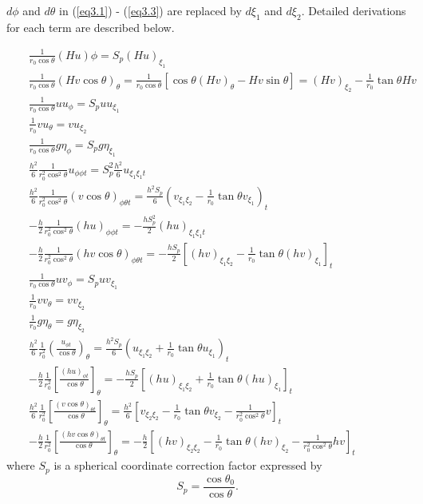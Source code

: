 \documentclass[11pt]{article}
\newcommand{\be}{\begin{equation}}
\newcommand{\ee}{\end{equation}}
\newcommand{\ba}{\begin{eqnarray}}
\newcommand{\ea}{\end{eqnarray}}
\begin{document}
$d\phi$ and $d\theta$ in (\ref{eq3.1}) - (\ref{eq3.3}) are replaced by $d\xi_1$ and $d\xi_2$. Detailed derivations for each term are described below.

\ba
&& \frac{1}{r_0 \cos \theta} (Hu)\phi = S_p (Hu)_{\xi_1}
\\
&&
\frac{1}{r_0 \cos \theta} (Hv\cos \theta)_\theta = \frac{1}{r_0 \cos \theta}  \left [ \cos \theta (Hv)_\theta - Hv \sin \theta \right ]
= (Hv)_{\xi_2} - \frac{1}{r_0} \tan \theta Hv
\\
&&
\frac{1}{r_0 \cos \theta} u u_\phi =S_p  u u_{\xi_1}
\\
&&
\frac{1}{r_0} v u_\theta = v u_{\xi_2}
\\
&&
\frac{1}{r_0 \cos \theta} g  \eta_\phi = S_p  g \eta_{\xi_1}
\\
&&
\frac{h^2}{6} \frac{1}{r_0^2 \cos ^2 \theta} u_{\phi \phi t} = S_p^2 \frac{h^2}{6} u_{\xi_1 \xi_1 t}
\\
&&
\frac{h^2}{6} \frac{1}{r_0^2 \cos ^2 \theta} (v \cos \theta)_{\phi \theta t} = \frac{h^2 S_p}{6} \left ( v_{\xi_1 \xi_2} -  \frac{1}{r_0} \tan \theta v_{\xi_1}  \right)_t
\\
&&
- \frac{h}{2} \frac{1}{r_0^2 \cos^2 \theta} (h u)_{\phi \phi t} = - \frac{hS_p^2}{2} (hu)_{\xi_1 \xi_1 t}
\\
&&
- \frac{h}{2} \frac{1}{r_0^2 \cos ^2 \theta} (hv \cos \theta)_{\phi \theta t} = - \frac{h S_p}{2} \left [ (hv)_{\xi_1 \xi_2} - \frac{1}{r_0} \tan \theta (hv)_{\xi_1} \right]_t
\\
&&
\frac{1}{r_0 \cos \theta} u v_\phi = S_p u v_{\xi_1}
\\
&&
\frac{1}{r_0} v v_\theta = v v_{\xi_2}
\\
&&
\frac{1}{r_0} g \eta_\theta = g \eta_{\xi_2}
\\
&&
\frac{h^2}{6} \frac{1}{r_0^2} \left ( \frac{u_{\phi t}}{\cos \theta} \right)_\theta = \frac{h^2 S_p}{6} \left( u_{\xi_1 \xi_2} + \frac{1}{r_0} \tan \theta u_{\xi_1} \right)_t 
\\
&&
- \frac{h}{2} \frac{1}{r_0^2} \left[ \frac{(hu)_{\phi t}}{\cos \theta} \right]_\theta = - \frac{h S_p}{2} \left[ (hu)_{\xi_1 \xi_2} + \frac{1}{r_0} \tan \theta (hu)_{\xi_1} \right]_t
\\
&&
\frac{h^2}{6} \frac{1}{r_0^2} \left [  \frac{(v\cos \theta)_{\theta t}}{\cos \theta}\right ]_\theta 
= \frac{h^2}{6} \left[   v_{\xi_2 \xi_2} - \frac{1}{r_0} \tan \theta v_{\xi_2}  - \frac{1}{r_0^2 \cos^2 \theta} v \right]_t
\\
&&
- \frac{h}{2} \frac{1}{r_0^2} \left[ \frac{(hv \cos \theta)_{\theta t}}{\cos \theta} \right]_\theta 
= -\frac{h}{2} \left[   (hv)_{\xi_2 \xi_2} - \frac{1}{r_0} \tan \theta (hv)_{\xi_2}  - \frac{1}{r_0^2 \cos^2 \theta} h v \right]_t
\ea
where $S_p$ is a spherical coordinate correction factor expressed by
\be
S_p = \frac{\cos \theta_0}{\cos \theta}.
\ee
\end{document}
